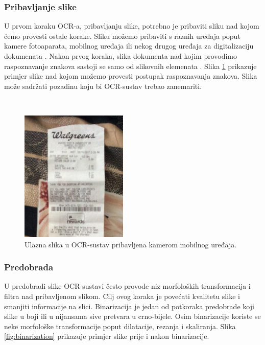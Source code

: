 \documentclass[times, utf8, zavrsni]{fer}
\begin{document}
\subsubsection{Pribavljanje slike}
U prvom koraku OCR-a, pribavljanju slike, potrebno je pribaviti sliku nad kojom
ćemo provesti ostale korake. Sliku možemo pribaviti s raznih uređaja poput
kamere fotoaparata, mobilnog uređaja ili nekog drugog uređaja za digitalizaciju
dokumenata . Nakon prvog koraka, slika dokumenta nad kojim
provodimo raspoznavanje znakova sastoji se samo od slikovnih elemenata
 \citep{Vynckier:2018:HowOcrWorks}. Slika
\ref{fig:receipt-example-02} prikazuje primjer slike nad kojom možemo provesti
postupak raspoznavanja znakova. Slika može sadržati pozadinu koju
bi OCR-sustav trebao zanemariti.

\

\begin{figure}[htb]
    \centering
    \includegraphics[height=6.3cm]{images/receipt-example-02.jpeg}
    \caption{Ulazna slika u OCR-sustav pribavljena kamerom mobilnog uređaja.}
    \label{fig:receipt-example-02}
\end{figure}


\subsubsection{Predobrada}
U predobradi slike OCR-sustavi često provode niz morfoloških transformacija i
filtra nad pribavljenom slikom. Cilj ovog koraka je povećati kvalitetu slike i
smanjiti informacije na slici. Binarizacija je jedan od potkoraka predobrade
koji slike u boji ili u nijansama sive pretvara u crno-bijele. Osim binarizacije
koriste se neke morfološke transformacije poput dilatacije, rezanja i
skaliranja. Slika \ref{fig:binarization} prikazuje primjer slike prije i nakon
binarizacije. \citep{Gulan:2016:Bacherlor}
\citep{DBLP:journals/corr/abs-1710-05703} \citep{Jurin:2017:Master}
\end{document}
